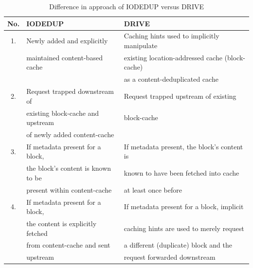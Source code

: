 \begin{table}[h]
\caption{Difference in approach of IODEDUP versus DRIVE}
\label{tab:drive-novelty}
\centering
\begin{tabular}{|c|l|l|} \hline
\textbf{No.} & \textbf{IODEDUP} & \textbf{DRIVE} \\ \hline
1. & Newly added and explicitly         & Caching hints used to implicitly manipulate \\
   & maintained content-based cache     & existing location-addressed cache (block-cache) \\
   &                                    & as a content-deduplicated cache \\ \hline
2. & Request trapped downstream of      & Request trapped upstream of existing\\ 
   & existing block-cache and upstream  & block-cache \\
   & of newly added content-cache       & \\ \hline
3. & If metadata present for a block,   & If metadata present, the block's content is \\
   & the block's content is known to be & known to have been fetched into cache \\
   & present within content-cache       & at least once before \\ \hline
4. & If metadata present for a block,   & If metadata present for a block, implicit \\
   & the content is explicitly fetched  & caching hints are used to merely request \\
   & from content-cache and sent        & a different (duplicate) block and the \\
   & upstream                           & request forwarded downstream \\ \hline
\end{tabular}
\end{table}

